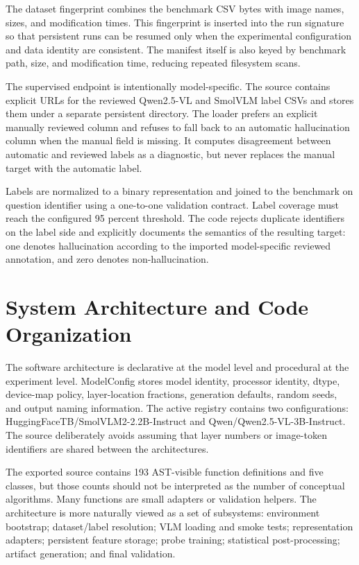 \documentclass[11pt,a4paper]{article}
\begin{document}
The dataset fingerprint combines the benchmark CSV bytes with image names, sizes, and modification times. This fingerprint is inserted into the run signature so that persistent runs can be resumed only when the experimental configuration and data identity are consistent. The manifest itself is also keyed by benchmark path, size, and modification time, reducing repeated filesystem scans.

The supervised endpoint is intentionally model-specific. The source contains explicit URLs for the reviewed Qwen2.5-VL and SmolVLM label CSVs and stores them under a separate persistent directory. The loader prefers an explicit manually reviewed column and refuses to fall back to an automatic hallucination column when the manual field is missing. It computes disagreement between automatic and reviewed labels as a diagnostic, but never replaces the manual target with the automatic label.

Labels are normalized to a binary representation and joined to the benchmark on question identifier using a one-to-one validation contract. Label coverage must reach the configured 95 percent threshold. The code rejects duplicate identifiers on the label side and explicitly documents the semantics of the resulting target: one denotes hallucination according to the imported model-specific reviewed annotation, and zero denotes non-hallucination.

\section{System Architecture and Code Organization}

The software architecture is declarative at the model level and procedural at the experiment level. ModelConfig stores model identity, processor identity, dtype, device-map policy, layer-location fractions, generation defaults, random seeds, and output naming information. The active registry contains two configurations: HuggingFaceTB/SmolVLM2-2.2B-Instruct and Qwen/Qwen2.5-VL-3B-Instruct. The source deliberately avoids assuming that layer numbers or image-token identifiers are shared between the architectures.

The exported source contains 193 AST-visible function definitions and five classes, but those counts should not be interpreted as the number of conceptual algorithms. Many functions are small adapters or validation helpers. The architecture is more naturally viewed as a set of subsystems: environment bootstrap; dataset/label resolution; VLM loading and smoke tests; representation adapters; persistent feature storage; probe training; statistical post-processing; artifact generation; and final validation.
\end{document}
